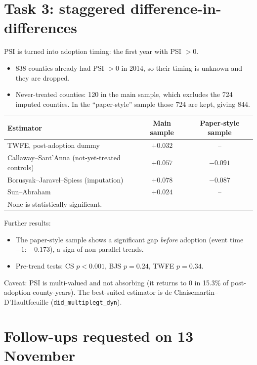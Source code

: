 \documentclass[11pt]{article}
\begin{document}
\section{Task 3: staggered difference-in-differences}
PSI is turned into adoption timing: the first year with PSI $>0$.
\begin{itemize}
\item 838 counties already had PSI $>0$ in 2014, so their timing is unknown and they are dropped.
\item Never-treated counties: 120 in the main sample, which excludes the 724 imputed counties. In the ``paper-style'' sample those 724 are kept, giving 844.
\end{itemize}

\begin{center}
\small
\begin{tabular}{l c c}
\toprule
Estimator & Main sample & Paper-style sample \\
\midrule
TWFE, post-adoption dummy & $+0.032$ & -- \\
Callaway--Sant'Anna (not-yet-treated controls) & $+0.057$ & $-0.091$ \\
Borusyak--Jaravel--Spiess (imputation) & $+0.078$ & $-0.087$ \\
Sun--Abraham & $+0.024$ & -- \\
\bottomrule
\multicolumn{3}{l}{\footnotesize None is statistically significant.}
\end{tabular}
\end{center}
Further results:
\begin{itemize}
\item The paper-style sample shows a significant gap \emph{before} adoption (event time $-1$: $-0.173$), a sign of non-parallel trends.
\item Pre-trend tests: CS $p<0.001$, BJS $p=0.24$, TWFE $p=0.34$.
\end{itemize}
Caveat: PSI is multi-valued and not absorbing (it returns to 0 in 15.3\% of post-adoption county-years). The best-suited estimator is de Chaisemartin--D'Haultf\oe uille (\texttt{did\_multiplegt\_dyn}).

\section{Follow-ups requested on 13 November}
\end{document}
